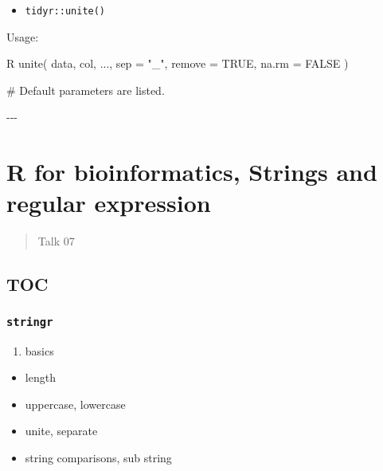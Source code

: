 \documentclass[
]{article}
\newenvironment{Shaded}{}{}
\newcommand{\NormalTok}[1]{#1}
\begin{document}
\begin{itemize}
\item
  \texttt{tidyr::unite()}
\end{itemize}

\begin{Shaded}
\begin{Highlighting}[]
\NormalTok{Usage:}

\NormalTok{\textasciigrave{}\textasciigrave{}\textasciigrave{}R}
\NormalTok{unite(}
\NormalTok{  data,}
\NormalTok{  col, }
\NormalTok{  ..., }
\NormalTok{  sep = "\_", }
\NormalTok{  remove = TRUE, }
\NormalTok{  na.rm = FALSE}
\NormalTok{)}

\NormalTok{\# Default parameters are listed.}
\NormalTok{\textasciigrave{}\textasciigrave{}\textasciigrave{}}

\NormalTok{{-}{-}{-}}
\end{Highlighting}
\end{Shaded}

\hypertarget{r-for-bioinformatics-strings-and-regular-expression}{%
\section{R for bioinformatics, Strings and regular
expression}\label{r-for-bioinformatics-strings-and-regular-expression}}

\begin{quote}
Talk 07
\end{quote}

\hypertarget{toc-3}{%
\subsection{TOC}\label{toc-3}}

\hypertarget{stringr}{%
\subsubsection{\texorpdfstring{\texttt{stringr}}{stringr}}\label{stringr}}

\begin{enumerate}
\def\labelenumi{\arabic{enumi}.}
\item
  basics
\end{enumerate}

\begin{itemize}
\item
  length
\item
  uppercase, lowercase
\item
  unite, separate
\item
  string comparisons, sub string
\end{itemize}
\end{document}
